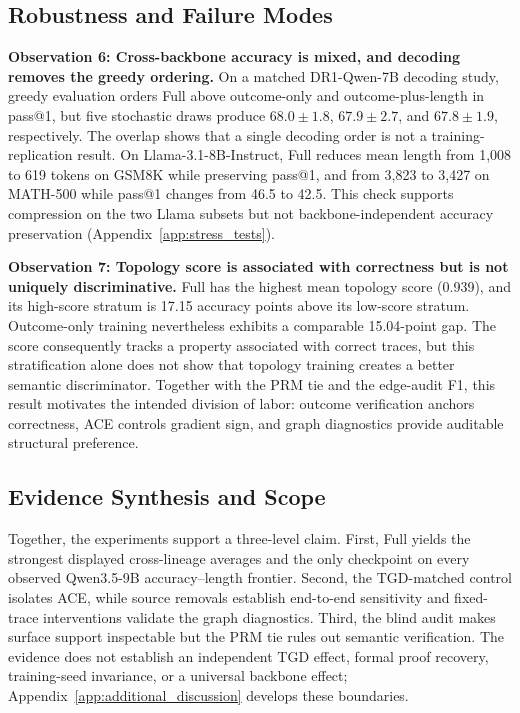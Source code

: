 \subsection{Robustness and Failure Modes}
\label{sec:robustness}

\noindent\textbf{Observation 6: Cross-backbone accuracy is mixed, and decoding removes the greedy ordering.}
On a matched DR1-Qwen-7B decoding study, greedy evaluation orders Full above outcome-only and outcome-plus-length in pass@1, but five stochastic draws produce $68.0\!\pm\!1.8$, $67.9\!\pm\!2.7$, and $67.8\!\pm\!1.9$, respectively. The overlap shows that a single decoding order is not a training-replication result. On Llama-3.1-8B-Instruct, Full reduces mean length from 1{,}008 to 619 tokens on GSM8K while preserving pass@1, and from 3{,}823 to 3{,}427 on MATH-500 while pass@1 changes from 46.5 to 42.5. This check supports compression on the two Llama subsets but not backbone-independent accuracy preservation (Appendix~\ref{app:stress_tests}).

\noindent\textbf{Observation 7: Topology score is associated with correctness but is not uniquely discriminative.}
Full has the highest mean topology score (0.939), and its high-score stratum is 17.15 accuracy points above its low-score stratum. Outcome-only training nevertheless exhibits a comparable 15.04-point gap. The score consequently tracks a property associated with correct traces, but this stratification alone does not show that topology training creates a better semantic discriminator. Together with the PRM tie and the edge-audit F1, this result motivates the intended division of labor: outcome verification anchors correctness, ACE controls gradient sign, and graph diagnostics provide auditable structural preference.

\subsection{Evidence Synthesis and Scope}
\label{sec:evidence_scope}

Together, the experiments support a three-level claim. First, Full yields the strongest displayed cross-lineage averages and the only checkpoint on every observed Qwen3.5-9B accuracy--length frontier. Second, the TGD-matched control isolates ACE, while source removals establish end-to-end sensitivity and fixed-trace interventions validate the graph diagnostics. Third, the blind audit makes surface support inspectable but the PRM tie rules out semantic verification. The evidence does not establish an independent TGD effect, formal proof recovery, training-seed invariance, or a universal backbone effect; Appendix~\ref{app:additional_discussion} develops these boundaries.
